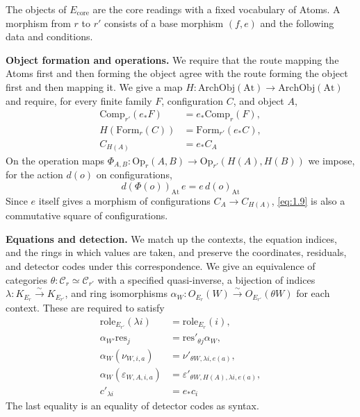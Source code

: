 \begin{definition}\label{def:1.28}

The objects of $E_{\mathrm{core}}$ are the core readings with a fixed vocabulary
of Atoms.
A morphism from $r$ to $r'$ consists of a base morphism $(f,e)$ and the
following data and conditions.

\textbf{Object formation and operations.}
We require that the route mapping the Atoms first and then forming the object
agree with the route forming the object first and then mapping it.
We give a map $H:\mathrm{ArchObj}(\mathrm{At})\to\mathrm{ArchObj}(\mathrm{At})$
and require, for every finite family $F$, configuration $C$, and object $A$,
\begin{equation*}
\begin{aligned}
\mathrm{Comp}_{r'}(e_*F)&=e_*\mathrm{Comp}_r(F),\\
H(\mathrm{Form}_r(C))&=\mathrm{Form}_{r'}(e_*C),\\
C_{H(A)}&=e_*C_A
\end{aligned}
\tag{1.8}\label{eq:1.8}
\end{equation*}
On the operation maps
$\Phi_{A,B}:\mathrm{Op}_r(A,B)\to\mathrm{Op}_{r'}(H(A),H(B))$ we impose, for
the action $d(o)$ on configurations,
\begin{equation*}
d(\Phi(o))_{\mathrm{At}}\,e=e\,d(o)_{\mathrm{At}}
\tag{1.9}\label{eq:1.9}
\end{equation*}
Since $e$ itself gives a morphism of configurations $C_A\to C_{H(A)}$,
\eqref{eq:1.9} is also a commutative square of configurations.

\textbf{Equations and detection.}
We match up the contexts, the equation indices, and the rings in which values
are taken, and preserve the coordinates, residuals, and detector codes under
this correspondence.
We give an equivalence of categories
$\theta:\mathcal{C}_r\simeq\mathcal{C}_{r'}$ with a specified quasi-inverse, a
bijection of indices $\lambda:K_{E_r}\xrightarrow{\sim}K_{E_{r'}}$, and ring
isomorphisms $\alpha_W:O_{E_r}(W)\xrightarrow{\sim}O_{E_{r'}}(\theta W)$ for
each context. These are required to satisfy
\begin{equation*}
\begin{aligned}
\mathrm{role}_{E_{r'}}(\lambda i)&=\mathrm{role}_{E_r}(i),\\
\alpha_{W'}\mathrm{res}_j&=\mathrm{res}'_{\theta j}\alpha_W,\\
\alpha_W(\nu_{W,i,a})&=\nu'_{\theta W,\lambda i,e(a)},\\
\alpha_W(\varepsilon_{W,A,i,a})
&=\varepsilon'_{\theta W,H(A),\lambda i,e(a)},\\
c'_{\lambda i}&=e_*c_i
\end{aligned}
\tag{1.10}\label{eq:1.10}
\end{equation*}
The last equality is an equality of detector codes as syntax.


\end{definition}
